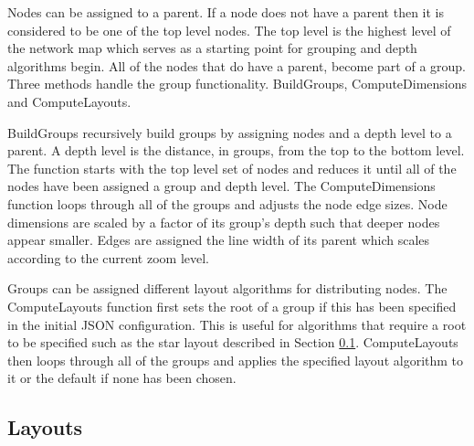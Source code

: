 \documentclass[11pt, a4paper]{article}
\begin{document}
Nodes can be assigned to a parent. If a node does not have a parent then it is
considered to be one of the top level nodes. The top level is the highest level
of the network map which serves as a starting point for grouping and depth
algorithms begin. All of the nodes that do have a parent, become part of a group.
Three methods handle the group functionality. BuildGroups, ComputeDimensions and
ComputeLayouts.

BuildGroups recursively build groups by assigning nodes and a depth level to a
parent. A depth level is the distance, in groups, from the top to the bottom
level. The function starts with the top level set of nodes and reduces it until
all of the nodes have been assigned a group and depth level. The
ComputeDimensions function loops through all of the groups and adjusts the node
edge sizes. Node dimensions are scaled by a factor of its group's depth such
that deeper nodes appear smaller. Edges are assigned the line width of its
parent which scales according to the current zoom level.

Groups can be assigned different layout algorithms for distributing nodes. The
ComputeLayouts function first sets the root of a group if this has been
specified in the initial JSON configuration. This is useful for algorithms that
require a root to be specified such as the star layout described in Section
\ref{sec:layouts.impl}. ComputeLayouts then loops through all of the groups and
applies the specified layout algorithm to it or the default if none has been
chosen. 


\subsection{Layouts}
\label{sec:layouts.impl}
\end{document}
